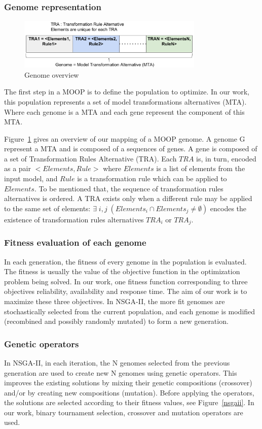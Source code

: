 \documentclass[conference]{IEEEtran}
\begin{document}
\subsubsection{\textbf{Genome representation}}
\begin{figure}[!ht]
\centering
\includegraphics[width=3.49in]{genome.pdf}
\caption{Genome overview}
\label{genome}
\end{figure}

The first step in a MOOP is to define the population to optimize. In our work, this population represents a set of model transformations alternatives (MTA). Where each genome is a MTA and each gene represent the component of this MTA.

Figure~\ref{genome} gives an overview of our mapping of a MOOP genome. A genome G represent a MTA and is composed of a sequences of genes. A gene is composed of a set of Transformation Rules Alternative (TRA). Each $TRA$ is, in turn, encoded as a pair $<Elements,Rule>$ where $Elements$ is a list of elements from the input model, and $Rule$ is a transformation rule which can be applied to $Elements$. To be mentioned that, the sequence of transformation rules alternatives is ordered. A TRA exists only when a different rule may be applied to the same set of elements: $\exists \; i,j \; (Elements_{i} \cap Elements_{j} \neq \emptyset)$ encodes the existence of transformation rules alternatives $TRA_{i}$ or $TRA_{j}$.

\subsubsection{\textbf{Fitness evaluation of each genome}}
In each generation, the fitness of every genome in the population is evaluated. The fitness is usually the value of the objective function in the optimization problem being solved. In our work, one fitness function corresponding to three objectives reliability, availability and response time.
The aim of our work is to maximize these three objectives. In NSGA-II, the more fit genomes are stochastically selected from the current population, and each genome is modified (recombined and possibly randomly mutated) to form a new generation.

\subsubsection{\textbf{Genetic operators}}
In NSGA-II, in each iteration, the N genomes selected from the previous generation are used to create new N genomes using genetic operators. This improves the existing solutions by mixing their genetic compositions (crossover) and/or by creating new compositions (mutation). Before applying the operators, the solutions are selected according to their fitness values, see Figure~\ref{nsgaii}. In our work, binary tournament selection, crossover and mutation operators are used.
\end{document}
